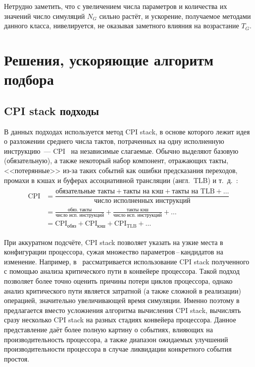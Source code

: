 Нетрудно заметить, что  с увеличением числа параметров и количества их значений число симуляций $N_G$ сильно растёт, и ускорение, получаемое методами данного класса, нивелируется, не оказывая заметного влияния на возрастание $T_G$.

\section{Решения, ускоряющие алгоритм подбора}

\subsection{CPI stack подходы}

В данных подходах используется метод CPI stack, в основе которого лежит идея о разложении среднего числа тактов, потраченных на одну исполненную инструкцию~--- CPI~ на независимые слагаемые. Обычно выделяют базовую (обязательную), а также некоторый набор компонент, отражающих такты, <<потерянные>> из-за таких событий как ошибки предсказания переходов, промахи в кэшах и буферах ассоциативной трансляции (англ.~TLB) и т.~д.~\cite{eyerman2006performance}:
\begin{align}\label{eq:CPIstack}
  \begin{split}
    \text{CPI} &= \dfrac{
      \text{обязательные такты} + \text{такты на кэш} + \text{такты на TLB} + \dots
      }{\text{число исполненных инструкций}}\\
      &= \frac{\text{обяз. такты}}{\text{число исп. инструкций}} + \frac{\text{такты кэш}}{\text{число исп. инструкций}} + \dots\\
      &= \text{CPI}_{\text{обяз}} + \text{CPI}_{\text{кэш}} + \text{CPI}_{\text{TLB}} + \dots
  \end{split}
\end{align}

При аккуратном подсчёте, CPI stack позволяет указать на узкие места в конфигурации процессора, сужая множество параметров\,--\,кандидатов на изменение. Например, в~\cite{lee2014rpstacks} рассматривается использование CPI stack полученного с помощью анализа критического пути в конвейере процессора. Такой подход позволяет более точно оценить причины потери циклов процессора, однако анализ критического пути является затратной (а также сложной в реализации) операцией, значительно увеличивающей время симуляции. Именно поэтому в~\cite{eyerman2017multi} предлагается вместо усложнения алгоритма вычисления CPI stack, вычислять сразу несколько CPI stack на разных стадиях конвейера процессора. Данное представление даёт более полную картину о событиях, влияющих на производительность процессора, а также диапазон ожидаемых улучшений производительности процессора в случае ликвидации конкретного события простоя.


